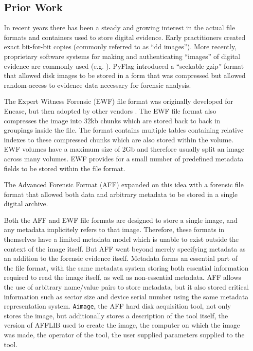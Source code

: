 \documentclass[10pt, conference]{IEEEtran}
\begin{document}
\subsection{Prior Work}
In recent years there has been a steady and growing interest in the
actual file formats and containers used to store digital
evidence. Early practitioners created exact bit-for-bit copies
(commonly referred to as ``dd images''). More recently, proprietary
software systems for making and authenticating ``images'' of digital
evidence are commonly used
(e.g. \cite{safeback,ilook,encase}). PyFlag\cite{pyflag} introduced a
``seekable gzip'' format that allowed disk images to be stored in a
form that was compressed but allowed random-access to evidence data
necessary for forensic analysis. 

The Expert Witness Forensic (EWF) file format was originally developed
for Encase\cite{encase}, but then adopted by other vendors
\cite{libewf}. The EWF file format also compresses the image into 32kb
chunks which are stored back to back in groupings inside the file. The
format contains multiple tables containing relative indexes to these
compressed chunks which are also stored within the volume. EWF volumes
have a maximum size of 2Gb and therefore usually split an image across
many volumes. EWF provides for a small number of predefined metadata
fields to be stored within the file format.

The Advanced Forensic Format (AFF) expanded on this idea with a
forensic file format that allowed both data and arbitrary metadata to
be stored in a single digital archive\cite{garfinkel:aff}. 

Both the AFF and EWF file formats are designed to store a single
image, and any metadata implicitely refers to that image. Therefore,
these formats in themselves have a limited metadata model which is
unable to exist outside the context of the image itself.  But AFF went
beyond merely specifying metadata as an addition to the forensic
evidence itself. Metadata forms an essential part of the file format,
with the same metadata system storing both essential information
required to read the image itself, as well as non-essential
metadata. AFF allows the use of arbitrary name/value pairs to store
metadata, but it also stored critical information such as sector size
and device serial number using the same metadata representation
system. \verb+Aimage+, the AFF hard disk acquisition tool, not only
stores the image, but additionally stores a description of the tool
itself, the version of AFFLIB used to create the image, the computer
on which the image was made, the operator of the tool, the user
supplied parameters supplied to the tool.
\end{document}
